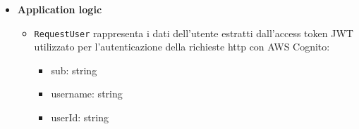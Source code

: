 \documentclass[a4paper, 11pt]{article}
\newcounter{subsubsubsection}[subsubsection]
\newcounter{subsubsubsubsection}[subsubsubsection]
\begin{document}
\begin{itemize}
  \item \textbf{Application logic}
    \begin{itemize}
      \item \texttt{RequestUser} rappresenta i dati dell'utente estratti dall'access token JWT utilizzato per l'autenticazione della richieste http con AWS Cognito:
        \begin{itemize}
          \item sub: string
          \item username: string
          \item userId: string
        \end{itemize}
    \end{itemize}

\end{itemize}
\end{document}
